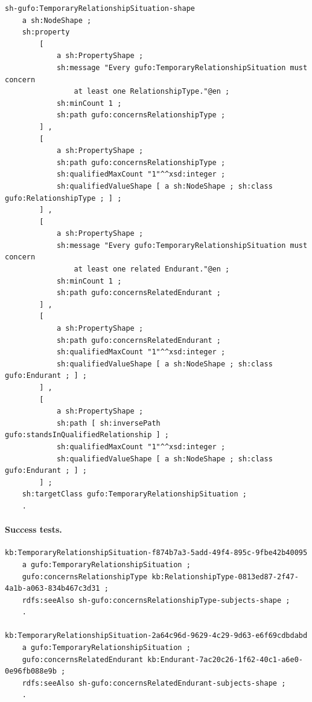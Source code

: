 \documentclass[12pt,a4paper]{article}
\begin{document}
\begin{lstlisting}[style=turtlestyle]
sh-gufo:TemporaryRelationshipSituation-shape
    a sh:NodeShape ;
    sh:property
        [
            a sh:PropertyShape ;
            sh:message "Every gufo:TemporaryRelationshipSituation must concern
                at least one RelationshipType."@en ;
            sh:minCount 1 ;
            sh:path gufo:concernsRelationshipType ;
        ] ,
        [
            a sh:PropertyShape ;
            sh:path gufo:concernsRelationshipType ;
            sh:qualifiedMaxCount "1"^^xsd:integer ;
            sh:qualifiedValueShape [ a sh:NodeShape ; sh:class gufo:RelationshipType ; ] ;
        ] ,
        [
            a sh:PropertyShape ;
            sh:message "Every gufo:TemporaryRelationshipSituation must concern
                at least one related Endurant."@en ;
            sh:minCount 1 ;
            sh:path gufo:concernsRelatedEndurant ;
        ] ,
        [
            a sh:PropertyShape ;
            sh:path gufo:concernsRelatedEndurant ;
            sh:qualifiedMaxCount "1"^^xsd:integer ;
            sh:qualifiedValueShape [ a sh:NodeShape ; sh:class gufo:Endurant ; ] ;
        ] ,
        [
            a sh:PropertyShape ;
            sh:path [ sh:inversePath gufo:standsInQualifiedRelationship ] ;
            sh:qualifiedMaxCount "1"^^xsd:integer ;
            sh:qualifiedValueShape [ a sh:NodeShape ; sh:class gufo:Endurant ; ] ;
        ] ;
    sh:targetClass gufo:TemporaryRelationshipSituation ;
    .
\end{lstlisting}

\paragraph{Success tests.}

\begin{lstlisting}[style=turtlestyle]
kb:TemporaryRelationshipSituation-f874b7a3-5add-49f4-895c-9fbe42b40095
    a gufo:TemporaryRelationshipSituation ;
    gufo:concernsRelationshipType kb:RelationshipType-0813ed87-2f47-4a1b-a063-834b467c3d31 ;
    rdfs:seeAlso sh-gufo:concernsRelationshipType-subjects-shape ;
    .

kb:TemporaryRelationshipSituation-2a64c96d-9629-4c29-9d63-e6f69cdbdabd
    a gufo:TemporaryRelationshipSituation ;
    gufo:concernsRelatedEndurant kb:Endurant-7ac20c26-1f62-40c1-a6e0-0e96fb088e9b ;
    rdfs:seeAlso sh-gufo:concernsRelatedEndurant-subjects-shape ;
    .
\end{lstlisting}
\end{document}
